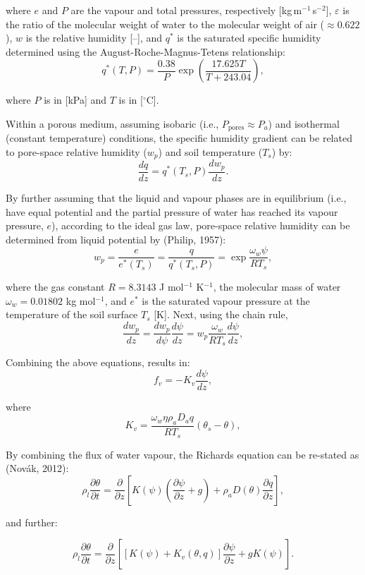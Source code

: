 \documentclass[10pt, letterpapr]{article}
\begin{document}
\noindent where $e$ and $P$ are the vapour and total pressures, respectively [kg\,m$^{-1}$\,s$^{-2}$], $\varepsilon$ is the ratio of the molecular weight of water to the molecular weight of air ($\approx 0.622$), $w$ is the relative humidity [--], and $q^*$ is the saturated specific humidity determined using the August-Roche-Magnus-Tetens relationship:
\[
	q^*(T,P)=\frac{0.38}{P}\exp\left(\frac{17.625T}{T+243.04}\right),
\]

\noindent where $P$ is in [kPa] and $T$ is in [$^\circ$C].

Within a porous medium, assuming isobaric (i.e., $P_\text{pores}\approx P_a$) and isothermal (constant temperature) conditions, the specific humidity gradient can be related to pore-space relative humidity ($w_p$) and soil temperature ($T_s$) by:
\[
	\frac{dq}{dz}=q^*(T_s,P)\frac{dw_p}{dz}.
\]

By further assuming that the liquid and vapour phases are in equilibrium (i.e., have equal potential and the partial pressure of water has reached its vapour pressure, $e$), according to the ideal gas law, pore-space relative humidity can be determined from liquid potential by (Philip, 1957):
\[ %
	w_p=\frac{e}{e^*(T_s)}=\frac{q}{q^*(T_s,P)}=\exp{\frac{\omega_w\psi}{RT_s}},
\]

\noindent where the gas constant $R=8.3143$ J mol$^{-1}$ K$^{-1}$, the molecular mass of water $\omega_w=0.01802$ kg mol$^{-1}$, and $e^*$ is the saturated vapour pressure at the temperature of the soil surface $T_s$ [K]. Next, using the chain rule,
\[
	\frac{dw_p}{dz}=\frac{dw_p}{d\psi}\frac{d\psi}{dz}=w_p\frac{\omega_w}{RT_s}\frac{d\psi}{dz},
\]

\noindent Combining the above equations, results in:
\[
	f_v=-K_v\frac{d\psi}{dz},
\]

\noindent where
\[
	K_v=\frac{\omega_w\eta\rho_aD_aq}{RT_s}\left(\theta_s-\theta\right),
\]

By combining the flux of water vapour, the Richards equation can be re-stated as (Nov\'ak, 2012): %
\[
	\rho_l\frac{\partial\theta}{\partial t}=\frac{\partial}{\partial z}\left[K(\psi)\left(\frac{\partial\psi}{\partial z}+g\right)+\rho_a D(\theta)\frac{\partial q}{\partial z}\right],
\]

\noindent and further:

\[
	\rho_l\frac{\partial\theta}{\partial t}=\frac{\partial}{\partial z}\left[\left[K(\psi)+K_v(\theta,q)\right]\frac{\partial\psi}{\partial z}+gK(\psi)\right].
\]
\end{document}
